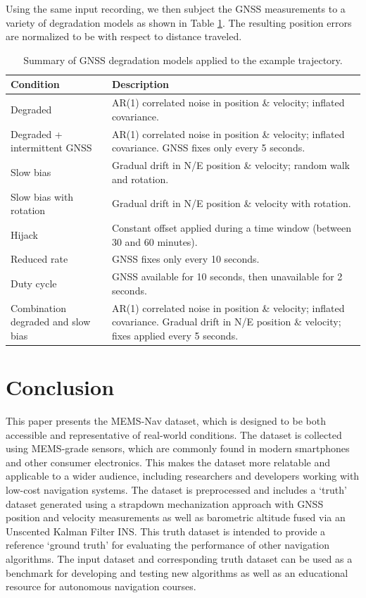 \documentclass[Afour,sageh,times]{sagej}
\begin{document}
Using the same input recording, we then subject the GNSS measurements to a variety of degradation models as shown in Table \ref{tab:degradation_models}. The resulting position errors are normalized to be with respect to distance traveled.

\begin{table}[]
\centering
\caption{Summary of GNSS degradation models applied to the example trajectory.}
\label{tab:degradation_models}
\begin{tabular}{|p{2cm}| p{5cm}|}
  \hline
  \textbf{Condition} & \textbf{Description} \\
  \hline
  Degraded & AR(1) correlated noise in position \& velocity; inflated covariance. \\
  \hline
  Degraded + intermittent GNSS & AR(1) correlated noise in position \& velocity; inflated covariance. GNSS fixes only every 5 seconds. \\
  \hline
  Slow bias & Gradual drift in N/E position \& velocity; random walk and rotation. \\
  \hline
  Slow bias with rotation & Gradual drift in N/E position \& velocity with rotation. \\
  \hline 
  Hijack & Constant offset applied during a time window (between 30 and 60 minutes). \\
  \hline
  Reduced rate & GNSS fixes only every 10 seconds. \\
  \hline
  Duty cycle & GNSS available for 10 seconds, then unavailable for 2 seconds. \\
  \hline
  Combination degraded and slow bias & AR(1) correlated noise in position \& velocity; inflated covariance. Gradual drift in N/E position \& velocity; fixes applied every 5 seconds. \\
  \hline
\end{tabular}
\end{table}


\section{Conclusion}

This paper presents the MEMS-Nav dataset, which is designed to be both accessible and representative of real-world conditions. The dataset is collected using MEMS-grade sensors, which are commonly found in modern smartphones and other consumer electronics. This makes the dataset more relatable and applicable to a wider audience, including researchers and developers working with low-cost navigation systems. The dataset is preprocessed and includes a `truth' dataset generated using a strapdown mechanization approach with GNSS position and velocity measurements as well as barometric altitude fused via an Unscented Kalman Filter INS. This truth dataset is intended to provide a reference `ground truth' for evaluating the performance of other navigation algorithms. The input dataset and corresponding truth dataset can be used as a benchmark for developing and testing new algorithms as well as an educational resource for autonomous navigation courses. 
\end{document}
